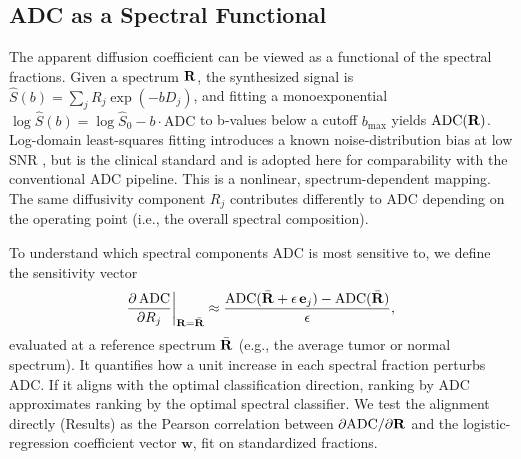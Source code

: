 \subsection{ADC as a Spectral Functional}

The apparent diffusion coefficient can be viewed as a functional of the spectral fractions. Given a spectrum $\mathbf{R}$, the synthesized signal is $\hat{S}(b) = \sum_j R_j \exp(-b D_j)$, and fitting a monoexponential $\log \hat{S}(b) = \log \hat{S}_0 - b \cdot \text{ADC}$ to b-values below a cutoff $b_{\max}$ yields $\text{ADC}(\mathbf{R})$.
Log-domain least-squares fitting introduces a known noise-distribution bias at low SNR \citep{kuczera2023truly}, but is the clinical standard and is adopted here for comparability with the conventional ADC pipeline.
This is a nonlinear, spectrum-dependent mapping. The same diffusivity component $R_j$ contributes differently to ADC depending on the operating point (i.e., the overall spectral composition).

To understand which spectral components ADC is most sensitive to, we define the sensitivity vector
%
\begin{equation}
  \frac{\partial \,\text{ADC}}{\partial R_j}\bigg|_{\mathbf{R} = \bar{\mathbf{R}}}
  \approx \frac{\text{ADC}(\bar{\mathbf{R}} + \epsilon \, \mathbf{e}_j) - \text{ADC}(\bar{\mathbf{R}})}{\epsilon},
  \label{eq:sensitivity}
\end{equation}
%
evaluated at a reference spectrum $\bar{\mathbf{R}}$ (e.g., the average tumor or normal spectrum).
It quantifies how a unit increase in each spectral fraction perturbs ADC. If it aligns with the optimal classification direction, ranking by ADC approximates ranking by the optimal spectral classifier. We test the alignment directly (Results) as the Pearson correlation between $\partial \text{ADC}/\partial \mathbf{R}$ and the logistic-regression coefficient vector $\mathbf{w}$, fit on standardized fractions.
